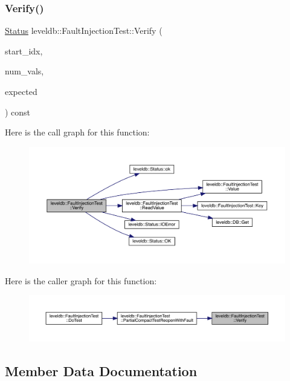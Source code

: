 \subsubsection{\texorpdfstring{Verify()}{Verify()}}
{\footnotesize\ttfamily \mbox{\hyperlink{classleveldb_1_1_status}{Status}} leveldb\+::\+Fault\+Injection\+Test\+::\+Verify (\begin{DoxyParamCaption}\item[{int}]{start\+\_\+idx,  }\item[{int}]{num\+\_\+vals,  }\item[{\mbox{\hyperlink{classleveldb_1_1_fault_injection_test_a5360c720d3ac8c6618f12400296feef9}{Expected\+Verif\+Result}}}]{expected }\end{DoxyParamCaption}) const\hspace{0.3cm}{\ttfamily [inline]}}

Here is the call graph for this function\+:
\nopagebreak
\begin{figure}[H]
\begin{center}
\leavevmode
\includegraphics[width=350pt]{classleveldb_1_1_fault_injection_test_a2c29a68922ed25a3c15713fc4780c76e_cgraph}
\end{center}
\end{figure}
Here is the caller graph for this function\+:
\nopagebreak
\begin{figure}[H]
\begin{center}
\leavevmode
\includegraphics[width=350pt]{classleveldb_1_1_fault_injection_test_a2c29a68922ed25a3c15713fc4780c76e_icgraph}
\end{center}
\end{figure}


\subsection{Member Data Documentation}
\mbox{\label{classleveldb_1_1_fault_injection_test_aa34cf3e5150932bc948f7d2bc00c9c71}} 

